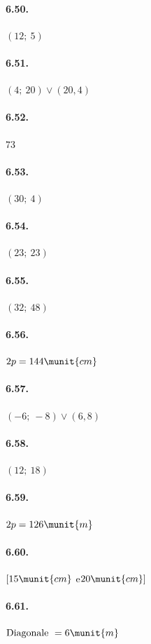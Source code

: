 \paragraph{6.50.}\((12;~5)\)

\paragraph{6.51.}\((4;~20)\vee (20,4)\)

\paragraph{6.52.}\(73\)

\paragraph{6.53.}\((30;~4)\)

\paragraph{6.54.}\((23;~23)\)

\paragraph{6.55.}\((32;~48)\)

\paragraph{6.56.}\(2p=144\munit{cm}\)

\paragraph{6.57.}\((-6;~-8)\vee (6,8)\)

\paragraph{6.58.}\((12;~18)\)

\paragraph{6.59.}\(2p=126\munit{m}\)

\paragraph{6.60.}\([15\munit{cm}\) e\(20\munit{cm}]\)

\paragraph{6.61.}\(\text{Diagonale }=6\munit{m}\)

